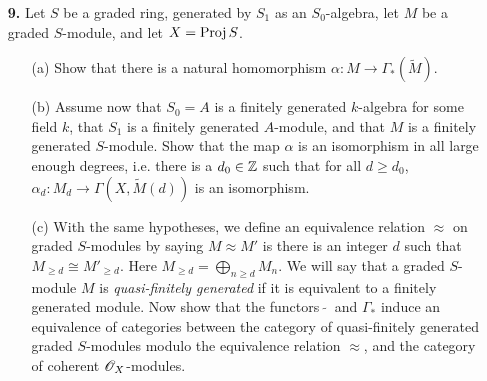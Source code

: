 \documentclass{article}
\begin{document}
\begin{enumerate} [label=\textbf{\arabic*.}, leftmargin=0em]
\begin{proof}
\begin{itemize} [leftmargin=0cm]
        \item[(c)] Let $x \in X$, let $\spec{A}$ be an open affine neighborhood of $x$ for some noetherian reduced ring $A$, and let $\goth{p}$ be the prime ideal corresponding to $x \in \spec{A}$. Set $r = \varphi(x)$. By (5.4), there exists a finitely generated $A$-module $M$ such that $\restr{\fF}{\spec{A}} = \tilde{M}$. Let $m_1, \dots, m_r \in \fF_x \cong M_\goth{p}$ such that their image in $\fF_x \otimes_{\fO_x} k(x)$ form a $k(x)$-basis. By Nakayama's lemma, the $m_i$'s generate $M_\goth{p}$ over $A_\goth{p}$, so they generate $M_\goth{q}$ for all prime ideals $\goth{q} \subseteq \goth{p}$. Suppose $\sum_{i = 1}^r a_i m_i = 0$ for $a_i \in A_\goth{p}$. Since the image of the $m_i$ in $M_\goth{q} \otimes_{A_\goth{q}} k(\goth{q})$ for all $i = 1, \dots, r$ form a $k(\goth{q})$-basis, the images of $a_i$ in $k(\goth{q})$ must be zero for all $i$. This implies $a_i$ is contained in all prime ideals of $A_\goth{p}$. However, $A_\goth{p}$ is reduced, so $a_i = 0$. Hence, $m_i$ are linearly independent.
    \end{itemize}
\end{proof}

\item[\textbf{9.}] Let $S$ be a graded ring, generated by $S_1$ as an $S_0$-algebra, let $M$ be a graded $S$-module, and let $X = \operatorname{Proj}{S}$.
\begin{itemize}
    \item[(a)] Show that there is a natural homomorphism $\alpha : M \to \Gamma_*(\tilde{M})$.
    \item[(b)] Assume now that $S_0 = A$ is a finitely generated $k$-algebra for some field $k$, that $S_1$ is a finitely generated $A$-module, and that $M$ is a finitely generated $S$-module. Show that the map $\alpha$ is an isomorphism in all large enough degrees, i.e. there is a $d_0 \in \mathbb{Z}$ such that for all $d \geq d_0$, $\alpha_d : M_d \to \Gamma(X, \tilde{M}(d))$ is an isomorphism.
    \item[(c)] With the same hypotheses, we define an equivalence relation $\approx$ on graded $S$-modules by saying $M \approx M'$ is there is an integer $d$ such that $M_{\geq d} \cong M'_{\geq d}$. Here $M_{\geq d} = \bigoplus_{n \geq d} M_n$. We will say that a graded $S$-module $M$ is \textit{quasi-finitely generated} if it is equivalent to a finitely generated module. Now show that the functors $~\tilde{}~$ and $\Gamma_*$ induce an equivalence of categories between the category of quasi-finitely generated graded $S$-modules modulo the equivalence relation $\approx$, and the category of coherent $\mathscr{O}_X$-modules.
\end{itemize}


\end{enumerate}
\end{document}
